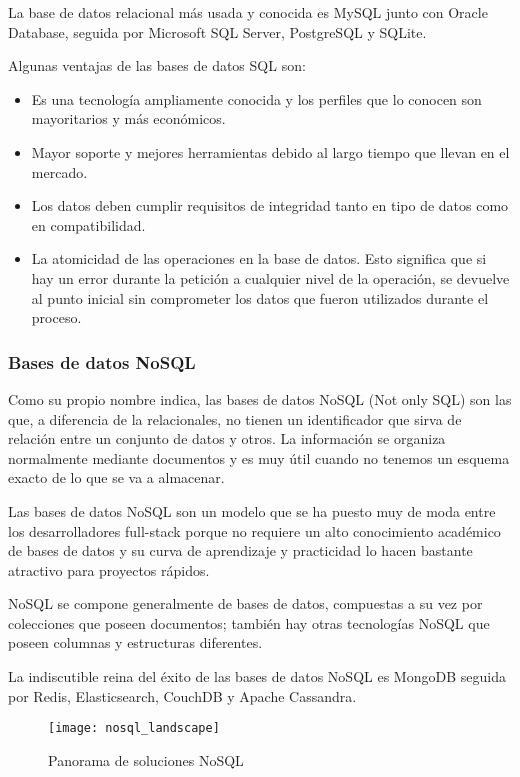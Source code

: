 La base de datos relacional más usada y conocida es MySQL junto con Oracle Database, seguida por Microsoft SQL Server, PostgreSQL y SQLite.

Algunas ventajas de las bases de datos SQL son:

\begin{itemize}
  \item Es una tecnología ampliamente conocida y los perfiles que lo conocen son mayoritarios y más económicos.
  \item Mayor soporte y mejores herramientas debido al largo tiempo que llevan en el mercado.
  \item Los datos deben cumplir requisitos de integridad tanto en tipo de datos como en compatibilidad.
  \item La atomicidad de las operaciones en la base de datos. Esto significa que si hay un error durante la petición a cualquier nivel de la operación, se devuelve al punto inicial sin comprometer los datos que fueron utilizados durante el proceso.
\end{itemize}

\subsubsection{Bases de datos NoSQL}

Como su propio nombre indica, las bases de datos NoSQL (Not only SQL) son las que, a diferencia de la relacionales, no tienen un identificador que sirva de relación entre un conjunto de datos y otros. La información se organiza normalmente mediante documentos y es muy útil cuando no tenemos un esquema exacto de lo que se va a almacenar.

Las bases de datos NoSQL son un modelo que se ha puesto muy de moda entre los desarrolladores full-stack porque no requiere un alto conocimiento académico de bases de datos y su curva de aprendizaje y practicidad lo hacen bastante atractivo para proyectos rápidos.

NoSQL se compone generalmente de bases de datos, compuestas a su vez por colecciones que poseen documentos; también hay otras tecnologías NoSQL que poseen columnas y estructuras diferentes.

La indiscutible reina del éxito de las bases de datos NoSQL es MongoDB seguida por Redis, Elasticsearch, CouchDB y Apache Cassandra.

\begin{figure}[htp!]
  \centering
  \texttt{[image: nosql\_landscape]}
  \caption{Panorama de soluciones NoSQL}
  \label{fig:nosql_landscape}
\end{figure}

